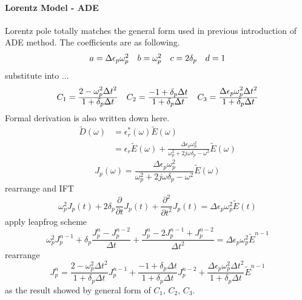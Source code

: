 \paragraph{\msjh Lorentz Model - ADE} Lorentz pole totally matches the general form used in previous introduction of ADE method.
The coefficients are as following.
\begin{equation*}
  \begin{array}{@{}llll@{}}
    a = \Delta\epsilon_p\omega_p^2 &
    b = \omega_p^2 &
    c = 2\delta_p &
    d = 1
  \end{array}
\end{equation*}
substitute into ...
\begin{gather*}
  \begin{array}{@{}lll@{}}
    C_1 = \frac{\displaystyle 2-\omega_p^2\Delta t^2}{\displaystyle 1+\delta_p\Delta t} &
    C_2 = \frac{\displaystyle -1 + \delta_p\Delta t}{\displaystyle 1+\delta_p\Delta t} &
    C_3 = \frac{\displaystyle \Delta\epsilon_p\omega_p^2\Delta t^2}{\displaystyle 1+\delta_p\Delta t}
  \end{array}
\end{gather*}
Formal derivation is also written down here.
\begin{equation}
  \begin{split}
    \widetilde{D}(\omega) & = \epsilon_r^*(\omega)\widetilde{E}(\omega)\\
    & = \epsilon_r\widetilde{E}(\omega) +  \frac{\Delta \epsilon_p \omega_p^2}{\omega_p^2+2j\omega\delta_p-\omega^2}\widetilde{E}(\omega)
  \end{split}
\end{equation}
\begin{equation}
  J_p(\omega) =  \frac{\Delta \epsilon_p \omega_p^2}{\omega_p^2+2j\omega\delta_p-\omega^2}\widetilde{E}(\omega)
\end{equation}
rearrange and IFT
\begin{equation}
  \omega_p^2J_p(t) + 2\delta_p\frac{\partial}{\partial t}J_p(t) + \frac{\partial^2}{\partial t^2}J_p(t) = \Delta\epsilon_p\omega_p^2\widetilde{E}(t)
\end{equation}
apply leapfrog scheme 
\begin{equation}
  \omega_p^2J_p^{n-1} + \delta_p\frac{J_p^n - J_p^{n-2}}{\Delta t} + \frac{J_p^n - 2 J_p^{n-1} + J_p^{n-2}}{\Delta t^2} = \Delta\epsilon_p\omega_p^2\widetilde{E}^{n-1}
\end{equation}
rearrange 
\begin{equation}
  J_p^n = 
  \frac{ 2-\omega_p^2\Delta t^2}{ 1+\delta_p\Delta t} J_p^{n-1} +
  \frac{ -1 + \delta_p\Delta t}{ 1+\delta_p\Delta t} J_p^{n-2} + 
  \frac{ \Delta\epsilon_p\omega_p^2\Delta t^2}{ 1+\delta_p\Delta t}\widetilde{E}^{n-1}
\end{equation}
as the result showed by general form of $C_1$, $C_2$, $C_3$.



